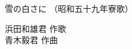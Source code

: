 \documentclass[10pt,b5j]{tarticle} %
\begin{document}
\begin{minipage}[c]{0.7\hsize} %
    \begin{center}
        {\LARGE
            雪の白さに %
        }
        {\small 
            （昭和五十九年寮歌） %
        }
    \end{center}
\end{minipage}
\begin{minipage}[c]{0.3\hsize} %
    \begin{flushright} %
        浜田和雄君 作歌\\青木毅君 作曲 %
    \end{flushright}
\end{minipage}
\end{document}
